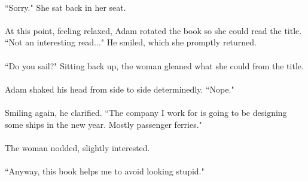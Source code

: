 \documentclass{article}
\begin{document}
\paragraph{}
``Sorry." She sat back in her seat.

\paragraph{}
At this point, feeling relaxed, Adam rotated the book so she could read the title. ``Not an interesting read..." He smiled, which she promptly returned.

\paragraph{}
``Do you sail?" Sitting back up, the woman gleaned what she could from the title.

\paragraph{}
Adam shaked his head from side to side determinedly. ``Nope."

\paragraph{}
Smiling again, he clarified. ``The company I work for is going to be designing some ships in the new year. Mostly passenger ferries."

\paragraph{}
The woman nodded, slightly interested.

\paragraph{}
``Anyway, this book helps me to avoid looking stupid."
\end{document}
